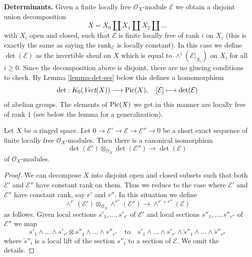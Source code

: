 \medskip\noindent
{\bf Determinants.} Given a  finite locally free
$\mathcal{O}_X$-module $\mathcal{E}$ we obtain a disjoint union
decomposition
$$
X = X_0 \amalg X_1 \amalg X_2 \amalg \ldots
$$
with $X_i$ open and closed, such that $\mathcal{E}$ is finite locally
free of rank $i$ on $X_i$ (this is exactly the same as saying the
$\text{rank}_\mathcal{E}$ is locally constant). In this case we define
$\det(\mathcal{E})$ as the invertible sheaf on $X$ which is equal to
$\wedge^i(\mathcal{E}|_{X_i})$ on $X_i$ for all $i \geq 0$.
Since the decomposition above is disjoint, there are no glueing
conditions to check. By Lemma \ref{lemma-det-ses} below
this defines a homomorphism
$$
\det : K_0(\textit{Vect}(X)) \longrightarrow \mathop{\mathrm{Pic}}\nolimits(X),\quad
[\mathcal{E}] \longmapsto \det(\mathcal{E})
$$
of abelian groups. The elements of $\mathop{\mathrm{Pic}}\nolimits(X)$ we get in this manner
are locally free of rank $1$ (see below the lemma for a generalization).

\begin{lemma}
\label{lemma-det-ses}
Let $X$ be a ringed space. Let
$0 \to \mathcal{E}' \to \mathcal{E} \to \mathcal{E}'' \to 0$
be a short exact sequence of finite locally free $\mathcal{O}_X$-modules.
Then there is a canonical isomorphism
$$
\det(\mathcal{E}') \otimes_{\mathcal{O}_X}\det(\mathcal{E}'')
\longrightarrow
\det(\mathcal{E})
$$
of $\mathcal{O}_X$-modules.
\end{lemma}

\begin{proof}
We can decompose $X$ into disjoint open and closed subsets such that
both $\mathcal{E}'$ and $\mathcal{E}''$ have constant rank on them.
Thus we reduce to the case where $\mathcal{E}'$ and $\mathcal{E}''$
have constant rank, say $r'$ and $r''$. In this situation we
define
$$
\wedge^{r'}(\mathcal{E}') \otimes_{\mathcal{O}_X} \wedge^{r''}(\mathcal{E}'')
\longrightarrow
\wedge^{r' + r''}(\mathcal{E})
$$
as follows. Given local sections $s'_1, \ldots, s'_{r'}$ of $\mathcal{E}'$
and local sections $s''_1, \ldots, s''_{r''}$ of $\mathcal{E}''$
we map
$$
s'_1 \wedge \ldots \wedge s'_{r'} \otimes
s''_1 \wedge \ldots \wedge s''_{r''}
\quad\text{to}\quad
s'_1 \wedge \ldots \wedge s'_{r'} \wedge
\tilde s''_1 \wedge \ldots \wedge \tilde s''_{r''}
$$
where $\tilde s''_i$ is a local lift of the section
$s''_i$ to a section of $\mathcal{E}$. We omit the details.
\end{proof}

